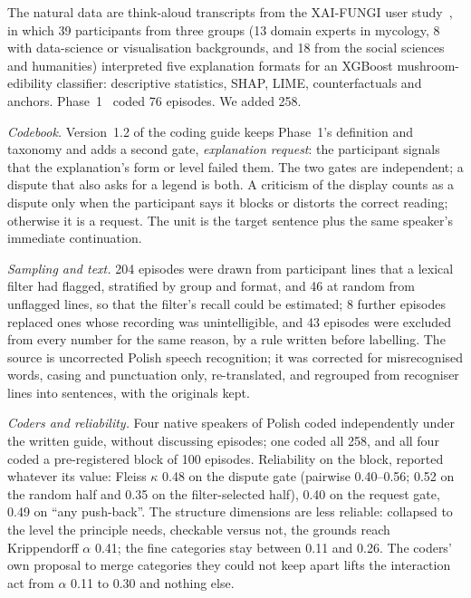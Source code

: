 \documentclass[preprint,12pt,3p,times]{elsarticle}
\begin{document}
The natural data are think-aloud transcripts from the XAI-FUNGI user study~\cite{bobek2025dataset}, in which 39 participants from three groups (13 domain experts in mycology, 8 with data-science or visualisation backgrounds, and 18 from the social sciences and humanities) interpreted five explanation formats for an XGBoost mushroom-edibility classifier: descriptive statistics, SHAP, LIME, counterfactuals and anchors. Phase~1~\cite{phase1} coded 76 episodes. We added 258.

\emph{Codebook.} Version~1.2 of the coding guide keeps Phase~1's definition and taxonomy and adds a second gate, \emph{explanation request}: the participant signals that the explanation's form or level failed them. The two gates are independent; a dispute that also asks for a legend is both. A criticism of the display counts as a dispute only when the participant says it blocks or distorts the correct reading; otherwise it is a request. The unit is the target sentence plus the same speaker's immediate continuation.

\emph{Sampling and text.} 204 episodes were drawn from participant lines that a lexical filter had flagged, stratified by group and format, and 46 at random from unflagged lines, so that the filter's recall could be estimated; 8 further episodes replaced ones whose recording was unintelligible, and 43 episodes were excluded from every number for the same reason, by a rule written before labelling. The source is uncorrected Polish speech recognition; it was corrected for misrecognised words, casing and punctuation only, re-translated, and regrouped from recogniser lines into sentences, with the originals kept.

\emph{Coders and reliability.} Four native speakers of Polish coded independently under the written guide, without discussing episodes; one coded all 258, and all four coded a pre-registered block of 100 episodes. Reliability on the block, reported whatever its value: Fleiss $\kappa$ 0.48 on the dispute gate (pairwise 0.40--0.56; 0.52 on the random half and 0.35 on the filter-selected half), 0.40 on the request gate, 0.49 on ``any push-back''. The structure dimensions are less reliable: collapsed to the level the principle needs, checkable versus not, the grounds reach Krippendorff $\alpha$ 0.41; the fine categories stay between 0.11 and 0.26. The coders' own proposal to merge categories they could not keep apart lifts the interaction act from $\alpha$ 0.11 to 0.30 and nothing else.
\end{document}
